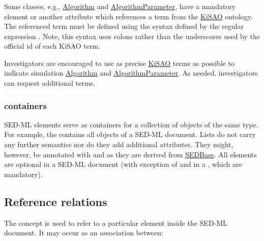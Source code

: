 \subsubsection{}
\label{sec:kisaoid}
Some classes, e.g., \hyperref[class:algorithm]{Algorithm} and \hyperref[class:algorithmParameter]{AlgorithmParameter}, have a mandatory element  or another attribute which references a term from the \hyperref[sec:kisao]{KiSAO} ontology. The referenced term must be defined using the syntax defined by the regular expression . Note, this syntax uses colons rather than the underscores used by the official id of each KiSAO term.

Investigators are encouraged to use as precise \hyperref[sec:kisao]{KiSAO} terms as possible to indicate simulation \hyperref[class:algorithm]{Algorithm} and \hyperref[class:algorithmParameter]{AlgorithmParameter}. As needed, investigators can request additional terms.


\subsubsection{ containers}
\label{class:listOf}
SED-ML  elements serve as containers for a collection of objects of the same type. For example, the \hyperref[class:listOfModels]{} contains all \Model objects of a SED-ML document. Lists do not carry any further semantics nor do they add additional attributes. They might, however, be annotated with \Notes and \Annotation as they are derived from \hyperref[class:sedBase]{SEDBase}. All  elements are optional in a SED-ML document (with exception of \hyperref[class:listOfRanges]{} and \hyperref[class:subTask]{} in a \RepeatedTask, which are mandatory).


\subsection{Reference relations}
\label{sec:reference}

The  concept is used to refer to a particular element inside the SED-ML document. It may occur as an association between:

